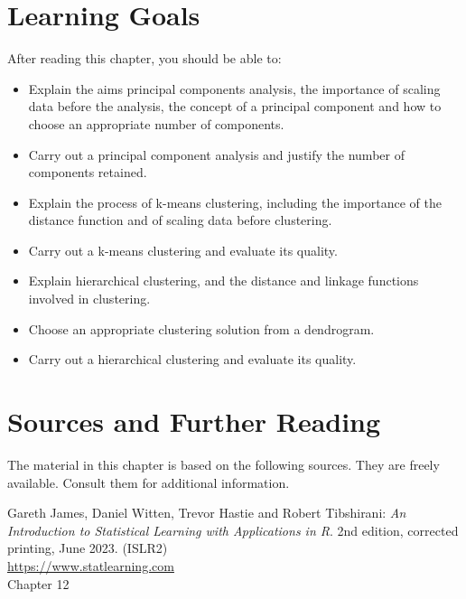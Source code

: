 %
%
\section*{Learning Goals}

After reading this chapter, you should be able to:
\begin{itemize}
   \item Explain the aims principal components analysis, the importance of scaling data before the analysis, the concept of a principal component and how to choose an appropriate number of components.
   \item Carry out a principal component analysis and justify the number of components retained.
   \item Explain the process of k-means clustering, including the importance of the distance function and of scaling data before clustering.
   \item Carry out a k-means clustering and evaluate its quality.
   \item Explain hierarchical clustering, and the distance and linkage functions involved in clustering.
   \item Choose an appropriate clustering solution from a dendrogram.
   \item Carry out a hierarchical clustering and evaluate its quality.
\end{itemize}

\section*{Sources and Further Reading}

The material in this chapter is based on the following sources. They are freely available. Consult them for additional information.

\begin{tcolorbox}[colback=alert]
Gareth James, Daniel Witten, Trevor Hastie and Robert Tibshirani: \emph{An Introduction to Statistical Learning with Applications in R}. 2nd edition, corrected printing, June 2023. (ISLR2) \\
\vspace{1mm}
\url{https://www.statlearning.com} \\
\vspace{1mm}
Chapter 12
\end{tcolorbox}

